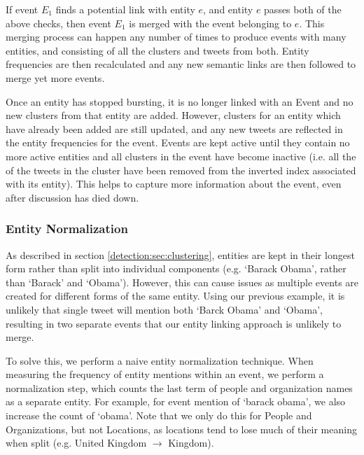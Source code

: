 If event $E_{1}$ finds a potential link with entity $e$, and entity $e$ passes both of the above checks, then event $E_1$ is merged with the event belonging to $e$. This merging process can happen any number of times to produce events with many entities, and consisting of all the clusters and tweets from both.
Entity frequencies are then recalculated and any new semantic links are then followed to merge yet more events.

Once an entity has stopped bursting, it is no longer linked with an Event and no new clusters from that entity are added.
However, clusters for an entity which have already been added are still updated, and any new tweets are reflected in the entity frequencies for the event.
Events are kept active until they contain no more active entities and all clusters in the event have become inactive (i.e. all the of the tweets in the cluster have been removed from the inverted index associated with its entity).
This helps to capture more information about the event, even after discussion has died down.

\subsubsection{Entity Normalization}
\label{sec:entityNorm}
As described in section \ref{detection:sec:clustering}, entities are kept in their longest form rather than split into individual components (e.g. `Barack Obama', rather than `Barack' and `Obama').
However, this can cause issues as multiple events are created for different forms of the same entity.
Using our previous example, it is unlikely that single tweet will mention both `Barck Obama' and `Obama', resulting in two separate events that our entity linking approach is unlikely to merge.

To solve this, we perform a naive entity normalization technique.
When measuring the frequency of entity mentions within an event, we perform a normalization step, which counts the last term of people and organization names as a separate entity.
For example, for event mention of `barack obama', we also increase the count of `obama'.
Note that we only do this for People and Organizations, but not Locations, as locations tend to lose much of their meaning when split (e.g. United Kingdom $\rightarrow$ Kingdom).